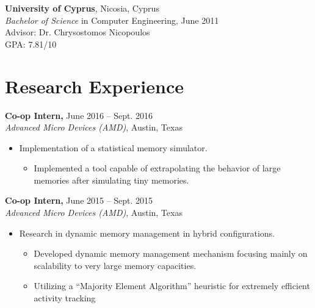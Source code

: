 \documentclass[11pt]{myres} %
\begin{document}
\begin{resume}
	{\color{blue}\textbf{University of Cyprus}, Nicosia, Cyprus} \\
	\emph{Bachelor of Science} in Computer Engineering, June 2011 \\
	Advisor: Dr. Chrysostomos Nicopoulos \\
	GPA: 7.81/10
 
\newpage

\section{Research Experience}

{\color{blue}\textbf{Co-op Intern,} June 2016 -- Sept. 2016} \\
\emph{Advanced Micro Devices (AMD)}, Austin, Texas \\
\begin{itemize} \itemsep -2pt
    \item Implementation of a statistical memory simulator.
    \begin{itemize}
    	\item Implemented a tool capable of extrapolating the behavior of large memories after simulating tiny memories.
    \end{itemize}
\end{itemize}

{\color{blue}\textbf{Co-op Intern,} June 2015 -- Sept. 2015} \\
\emph{Advanced Micro Devices (AMD)}, Austin, Texas \\
\begin{itemize} \itemsep -2pt
    \item Research in dynamic memory management in hybrid configurations.
    \begin{itemize}
    	\item Developed dynamic memory management mechanism focusing mainly on scalability to very large memory capacities.
    	\item Utilizing a ``Majority Element Algorithm'' heuristic for extremely efficient activity tracking
    \end{itemize}
\end{itemize}


\end{resume}
\end{document}
